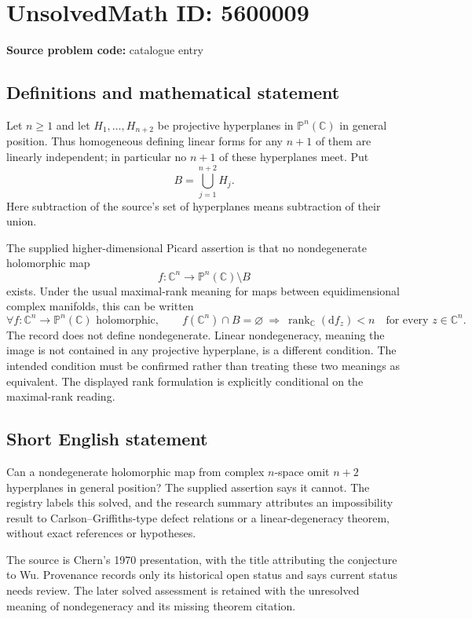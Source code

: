 \documentclass[11pt]{article}
\newcommand{\C}{\mathbb{C}}
\newcommand{\PP}{\mathbb{P}}
\begin{document}
\section*{UnsolvedMath ID: 5600009}
\textbf{Source problem code:} catalogue entry
\subsection{Definitions and mathematical statement}
Let $n\ge1$ and let $H_1,\ldots,H_{n+2}$ be projective hyperplanes in $\PP^n(\C)$ in general position. Thus homogeneous defining linear forms for any $n+1$ of them are linearly independent; in particular no $n+1$ of these hyperplanes meet. Put
\[
 B=\bigcup_{j=1}^{n+2}H_j.
\]
Here subtraction of the source's set of hyperplanes means subtraction of their union.

The supplied higher-dimensional Picard assertion is that no nondegenerate holomorphic map
\[
 f:\C^n\longrightarrow\PP^n(\C)\setminus B
\]
exists. Under the usual maximal-rank meaning for maps between equidimensional complex manifolds, this can be written
\[
 \forall f:\C^n\to\PP^n(\C)\text{ holomorphic},\qquad
 f(\C^n)\cap B=\varnothing
 \ \Longrightarrow\
 \operatorname{rank}_{\C}(\mathrm df_z)<n
 \quad\text{for every }z\in\C^n.
\]
The record does not define nondegenerate. Linear nondegeneracy, meaning the image is not contained in any projective hyperplane, is a different condition. The intended condition must be confirmed rather than treating these two meanings as equivalent. The displayed rank formulation is explicitly conditional on the maximal-rank reading.
\subsection{Short English statement}
Can a nondegenerate holomorphic map from complex $n$-space omit $n+2$ hyperplanes in general position? The supplied assertion says it cannot. The registry labels this solved, and the research summary attributes an impossibility result to Carlson--Griffiths-type defect relations or a linear-degeneracy theorem, without exact references or hypotheses.

The source is Chern's 1970 presentation, with the title attributing the conjecture to Wu. Provenance records only its historical open status and says current status needs review. The later solved assessment is retained with the unresolved meaning of nondegeneracy and its missing theorem citation.
\end{document}
